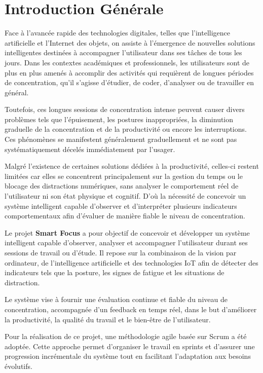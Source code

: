 \chapter*{Introduction Générale}

Face à l'avancée rapide des technologies digitales, telles que l'intelligence artificielle et l'Internet des objets, on assiste à l'émergence de nouvelles solutions intelligentes destinées à accompagner l'utilisateur dans ses tâches de tous les jours. Dans les contextes académiques et professionnels, les utilisateurs sont de plus en plus amenés à accomplir des activités qui requièrent de longues périodes de concentration, qu'il s'agisse d'étudier, de coder, d'analyser ou de travailler en général.

Toutefois, ces longues sessions de concentration intense peuvent causer divers problèmes tels que l'épuisement, les postures inappropriées, la diminution graduelle de la concentration et de la productivité ou encore les interruptions. Ces phénomènes se manifestent généralement graduellement et ne sont pas systématiquement décelés immédiatement par l'usager.

Malgré l'existence de certaines solutions dédiées à la productivité, celles-ci restent limitées car elles se concentrent principalement sur la gestion du temps ou le blocage des distractions numériques, sans analyser le comportement réel de l'utilisateur ni son état physique et cognitif. D'où la nécessité de concevoir un système intelligent capable d'observer et d'interpréter plusieurs indicateurs comportementaux afin d'évaluer de manière fiable le niveau de concentration.

Le projet \textbf{Smart Focus} a pour objectif de concevoir et développer un système intelligent capable d'observer, analyser et accompagner l'utilisateur durant ses sessions de travail ou d'étude. Il repose sur la combinaison de la vision par ordinateur, de l'intelligence artificielle et des technologies IoT afin de détecter des indicateurs tels que la posture, les signes de fatigue et les situations de distraction.

Le système vise à fournir une évaluation continue et fiable du niveau de concentration, accompagnée d'un feedback en temps réel, dans le but d'améliorer la productivité, la qualité du travail et le bien-être de l'utilisateur.

Pour la réalisation de ce projet, une méthodologie agile basée sur Scrum a été adoptée. Cette approche permet d'organiser le travail en sprints et d'assurer une progression incrémentale du système tout en facilitant l'adaptation aux besoins évolutifs.

